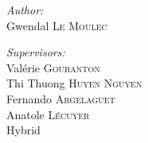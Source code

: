 \documentclass[11pt]{article}
\begin{document}
\begin{titlepage}
\begin{center}
\begin{comment}
Technology for Human Learning 
Artificial Intelligence 
Computer Arithmetic
Hardware Architecture
Automatic Control Engineering
Bioinformatics 
Biotechnology
Computational Complexity 
Computational Engineering, Finance, and Science
Computational Geometry 
Computation and Language 
Cryptography and Security 
Computer Vision and Pattern Recognition
Computers and Society 
Databases 
Distributed, Parallel, and Cluster Computing 
Digital Libraries
Discrete Mathematics 
Data Structures and Algorithms 
Embedded Systems 
Emerging Technologies 
Formal Languages and Automata Theory 
General Literature 
Graphics 
Computer Science and Game Theory 
Human-Computer Interaction 
Computer Aided Engineering 
Medical Imaging 
Information Retrieval 
Information Theory 
Ubiquitous Computing 
Machine Learning
Logic in Computer Science 
Multiagent Systems 
Mobile Computing
Multimedia
Modeling and Simulation 
Mathematical Software 
Numerical Analysis 
Neural and Evolutionary Computing 
Networking and Internet Architecture 
Operating Systems 
Performance 
Programming Languages 
Robotics 
Operations Research
Symbolic Computation 
Sound
Software Engineering 
Social and Information Networks 
Systems and Control 
Image Processing 
Signal and Image Processing 
Document and Text Processing
Web
\end{comment}
%
\begin{minipage}{0.4\textwidth}
\begin{flushleft} \large
\emph{Author:}\\
Gwendal  \textsc{Le Moulec}
\end{flushleft}
\end{minipage}
\begin{minipage}{0.4\textwidth}
\begin{flushright} \large
\emph{Supervisors:} \\
%
Valérie \textsc{Gouranton } \\
Thi Thuong \textsc{Huyen Nguyen } \\
Fernando \textsc{Argelaguet}\\
Anatole \textsc{L\'ecuyer}\\
Hybrid
\end{flushright}
\end{minipage}

\vfill



\end{center}
\end{titlepage}
\end{document}
